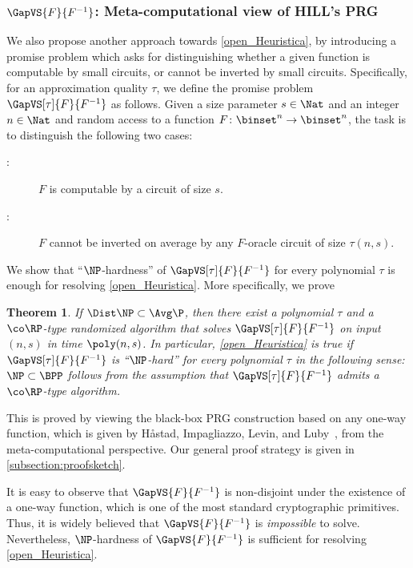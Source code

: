 \documentclass[11pt]{article}
\numberwithin{equation}{section}
\newtheorem{theorem}{Theorem}[section]
\theoremstyle{definition}
\theoremstyle{plain}
\begin{document}
\subsubsection{\texorpdfstring{$\GapVS{F}{F^{-1}}$}{Gap(F vs F(-1))}: Meta-computational view of HILL's PRG}

We also propose another approach towards
\cref{open_Heuristica},
by introducing a promise problem
which asks for distinguishing whether a given function is
computable by small circuits,
or cannot be inverted by small circuits.
Specifically,
for an approximation quality $\tau$,
we define the promise problem $\GapVS[\tau]{F}{F^{-1}}$
as follows.
Given a size parameter $s \in \Nat$ and an integer $n \in \Nat$ and random access to a function $F \colon \binset^n \to \binset^n$,
the task is to distinguish the following two cases:
\begin{description}
  \item
        [\Yes:]
        $F$ is computable by a circuit of size $s$.
  \item
        [\No:]
        $F$ cannot be inverted on average by any $F$-oracle circuit of size $\tau(n, s)$.
\end{description}

We show that ``$\NP$-hardness'' of $\GapVS[\tau]{F}{F^{-1}}$
for every polynomial $\tau$
is enough for resolving \cref{open_Heuristica}.
More specifically,
we prove
\begin{theorem}
  If $\Dist\NP \subset \Avg\P$,
  then there exist a polynomial $\tau$
  and
  a $\co\RP$-type randomized algorithm that solves
  $\GapVS[\tau]{F}{F^{-1}}$
  on input $(n, s)$
  in time $\poly(n, s)$.
  In particular,
  \cref{open_Heuristica} is true
  if $\GapVS[\tau]{F}{F^{-1}}$ is \textup{``}$\NP$-hard\textup{''} for every polynomial $\tau$
  in the following sense:
  $\NP \subset \BPP$ follows from the assumption that
  $\GapVS[\tau]{F}{F^{-1}}$ admits a $\co\RP$-type algorithm.
\end{theorem}
This is proved by viewing the black-box PRG construction
based on any one-way function,
which is given by
H{\aa}stad, Impagliazzo, Levin, and Luby~\cite{HastadILL99_siamcomp_journals},
from the meta-computational perspective.
Our general proof strategy is given in \cref{subsection:proofsketch}.

It is easy to observe that
$\GapVS{F}{F^{-1}}$
is non-disjoint
under
the existence of a one-way function,
which is one of the most standard cryptographic primitives.
Thus,
it is widely believed that
$\GapVS{F}{F^{-1}}$ is
\emph{impossible} to solve.
Nevertheless, $\NP$-hardness of $\GapVS{F}{F^{-1}}$
is sufficient for resolving \cref{open_Heuristica}.
\end{document}
